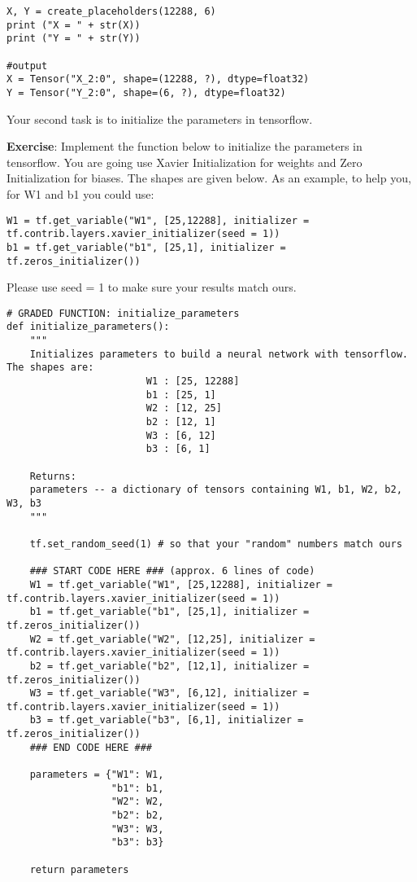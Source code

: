 \begin{verbatim} 
X, Y = create_placeholders(12288, 6)
print ("X = " + str(X))
print ("Y = " + str(Y))

#output
X = Tensor("X_2:0", shape=(12288, ?), dtype=float32)
Y = Tensor("Y_2:0", shape=(6, ?), dtype=float32)
\end{verbatim} 



Your second task is to initialize the parameters in tensorflow.

{\textbf {Exercise}}: Implement the function below to initialize the parameters in tensorflow. You are going use Xavier Initialization for weights and Zero Initialization for biases. The shapes are given below. As an example, to help you, for W1 and b1 you could use:
\begin{verbatim} 
W1 = tf.get_variable("W1", [25,12288], initializer = tf.contrib.layers.xavier_initializer(seed = 1))
b1 = tf.get_variable("b1", [25,1], initializer = tf.zeros_initializer())
\end{verbatim} 

Please use seed = 1 to make sure your results match ours.

\begin{verbatim}
# GRADED FUNCTION: initialize_parameters
def initialize_parameters():
    """
    Initializes parameters to build a neural network with tensorflow. The shapes are:
                        W1 : [25, 12288]
                        b1 : [25, 1]
                        W2 : [12, 25]
                        b2 : [12, 1]
                        W3 : [6, 12]
                        b3 : [6, 1]
    
    Returns:
    parameters -- a dictionary of tensors containing W1, b1, W2, b2, W3, b3
    """
    
    tf.set_random_seed(1) # so that your "random" numbers match ours
        
    ### START CODE HERE ### (approx. 6 lines of code)
    W1 = tf.get_variable("W1", [25,12288], initializer = tf.contrib.layers.xavier_initializer(seed = 1))  
    b1 = tf.get_variable("b1", [25,1], initializer = tf.zeros_initializer())  
    W2 = tf.get_variable("W2", [12,25], initializer = tf.contrib.layers.xavier_initializer(seed = 1))  
    b2 = tf.get_variable("b2", [12,1], initializer = tf.zeros_initializer())  
    W3 = tf.get_variable("W3", [6,12], initializer = tf.contrib.layers.xavier_initializer(seed = 1))  
    b3 = tf.get_variable("b3", [6,1], initializer = tf.zeros_initializer())  
    ### END CODE HERE ###

    parameters = {"W1": W1,
                  "b1": b1,
                  "W2": W2,
                  "b2": b2,
                  "W3": W3,
                  "b3": b3}
    
    return parameters
 \end{verbatim}    

